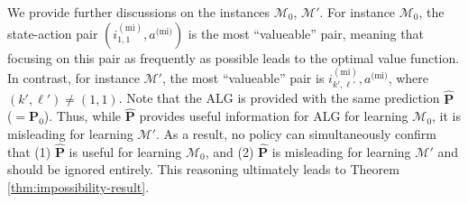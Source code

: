 \documentclass[12pt]{article}
\begin{document}
\label{sec:app-discuss-thm-impossibility}

We provide further discussions on the instances $\mathcal{M}_0$, $\mathcal{M}'$. For instance $\mathcal{M}_0$, the state-action pair $(i^{(\text{mi})}_{1,1},a^{\text{(mi)}})$ is the most ``valueable'' pair, meaning that focusing on this pair as frequently as possible leads to the optimal value function. In contrast, for instance $\mathcal{M}'$, the most ``valueable'' pair is $i^{(\text{mi})}_{k',\ell'},a^{\text{(mi)}}$, where $(k',\ell') \ne (1,1)$. Note that the ALG is provided with the same prediction $\hat{\boldsymbol{\text{P}}}$ ($= \boldsymbol{\text{P}}_0$). Thus, while $\hat{\boldsymbol{\text{P}}}$ provides useful information for ALG for learning $\mathcal{M}_0$, it is misleading for learning $\mathcal{M}'$. As a result, no policy can simultaneously confirm that (1) $\hat{\boldsymbol{\text{P}}}$ is useful for learning $\mathcal{M}_0$, and (2) $\hat{\boldsymbol{\text{P}}}$ is misleading for learning $\mathcal{M}'$ and should be ignored entirely. This reasoning ultimately leads to Theorem \ref{thm:impossibility-result}.

\end{document}
